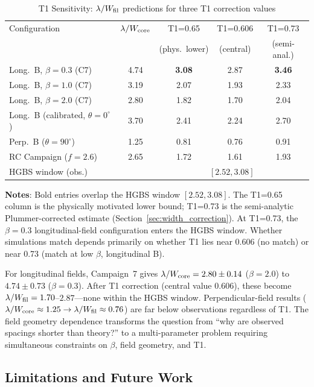 \documentclass[twoside,twocolumn]{mnras}
\begin{document}
\begin{table}
\caption{T1 Sensitivity: $\lambda/W_{\rm fil}$ predictions for three T1 correction values}
\label{tab:t1_budget}
\small
\begin{tabular}{lcccc}
\toprule
Configuration & $\lambda/W_{\rm core}$ & T1=0.65 & T1=0.606 & T1=0.73 \\
              &                       & (phys.\ lower) & (central) & (semi-anal.) \\
\midrule
Long.\ B, $\beta=0.3$ (C7) & 4.74 & \textbf{3.08} & 2.87 & \textbf{3.46} \\
Long.\ B, $\beta=1.0$ (C7) & 3.19 & 2.07 & 1.93 & 2.33 \\
Long.\ B, $\beta=2.0$ (C7) & 2.80 & 1.82 & 1.70 & 2.04 \\
Long.\ B (calibrated, $\theta=0^\circ$) & 3.70 & 2.41 & 2.24 & 2.70 \\
Perp.\ B ($\theta=90^\circ$) & 1.25 & 0.81 & 0.76 & 0.91 \\
RC Campaign ($f=2.6$) & 2.65 & 1.72 & 1.61 & 1.93 \\
\midrule
\multicolumn{2}{l}{HGBS window (obs.)} & \multicolumn{3}{c}{$[2.52, 3.08]$} \\
\bottomrule
\end{tabular}
\vspace{2pt}
\footnotesize
\textbf{Notes}: Bold entries overlap the HGBS window $[2.52, 3.08]$. The T1=0.65 column is the physically motivated lower bound; T1=0.73 is the semi-analytic Plummer-corrected estimate (Section~\ref{sec:width_correction}). At T1=0.73, the $\beta=0.3$ longitudinal-field configuration enters the HGBS window. Whether simulations match depends primarily on whether T1 lies near 0.606 (no match) or near 0.73 (match at low $\beta$, longitudinal B).
\end{table}

For longitudinal fields, Campaign~7 gives $\lambda/W_{\rm core} = 2.80 \pm 0.14$
($\beta = 2.0$) to $4.74 \pm 0.73$ ($\beta = 0.3$). After T1 correction (central
value 0.606), these become $\lambda/W_{\rm fil} = 1.70$--$2.87$---none within the
HGBS window. Perpendicular-field results ($\lambda/W_{\rm core} \approx 1.25 \to
\lambda/W_{\rm fil} \approx 0.76$) are far below observations regardless of T1.
The field geometry dependence transforms the question from ``why are observed spacings
shorter than theory?'' to a multi-parameter problem requiring simultaneous constraints
on $\beta$, field geometry, and T1.

\subsection{Limitations and Future Work}
\end{document}
